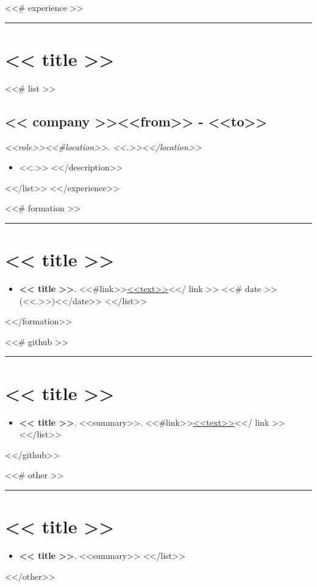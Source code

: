 \documentclass[<<fontsize>>]{article}
\providecommand{\tightlist}{%
  \setlength{\itemsep}{0pt}\setlength{\parskip}{0pt}}
\begin{document}

<<# experience >>
\begin{center}\rule{0.5\linewidth}{0.5pt}\end{center}
\section{<< title >>}

<<# list >>
\subsection{<< company >>\hfill \small <<from>> - <<to>>}
\textit{<<role>><<#location>>. <<.>><</location>>}
\begin{itemize}
  \tightlist
  <<#description>>
  \item <<.>>
  <</description>>
\end{itemize}
<</list>>
<</experience>>



<<# formation >>
\begin{center}\rule{0.5\linewidth}{0.5pt}\end{center}
\section{<< title >>}

\begin{itemize}
  \tightlist
  <<# list >>
    \item \textbf{<< title >>}. <<#link>>\href{<<to>>}{<<text>>}<</ link >> <<# date >>(<<.>>)<</date>>
  <</list>>
\end{itemize}
<</formation>>


<<# github >>
\begin{center}\rule{0.5\linewidth}{0.5pt}\end{center}
\section{<< title >>}

\begin{itemize}
  \tightlist
  <<# list >>
    \item \textbf{<< title >>}. <<summary>>. <<#link>>\href{<<to>>}{<<text>>}<</ link >>
  <</list>>
\end{itemize}
<</github>>


<<# other >>
\begin{center}\rule{0.5\linewidth}{0.5pt}\end{center}
\section{<< title >>}

\begin{itemize}
  \tightlist
  <<# list >>
    \item \textbf{<< title >>}. <<summary>>
  <</list>>
\end{itemize}
<</other>>
\end{document}
